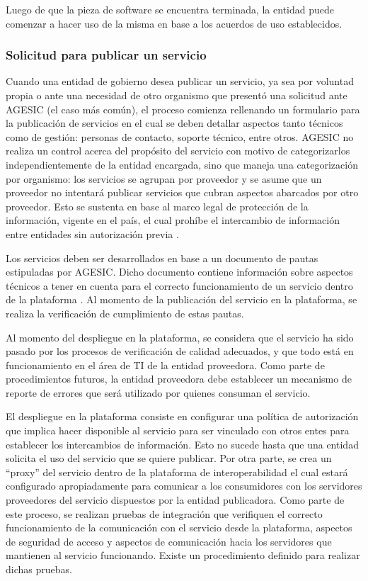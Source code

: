 Luego de que la pieza de software se encuentra terminada, la entidad puede comenzar a hacer uso de la misma en base a los acuerdos de uso establecidos.

\subsubsection{Solicitud para publicar un servicio}	
\label{Analisis:SolicitudPublicarServicio}
Cuando una entidad de gobierno desea publicar un servicio, ya sea por voluntad propia o ante una necesidad de otro organismo que presentó una solicitud ante AGESIC (el caso más común), el proceso comienza rellenando un formulario para la publicación de servicios en el cual se deben detallar aspectos tanto técnicos como de gestión: personas de contacto, soporte técnico, entre otros. \cite{Agesic:FormularioSolicitudV2.7}
AGESIC no realiza un control acerca del propósito del servicio con motivo de 
categorizarlos independientemente de la entidad encargada, sino que maneja una categorización por organismo: los servicios se agrupan por proveedor y se asume que un proveedor no intentará publicar servicios que cubran aspectos abarcados por otro proveedor. Esto se sustenta en base al marco legal de protección de la información, vigente en el país, el cual prohíbe el intercambio de información entre entidades sin autorización previa \cite{Ley} .

Los servicios deben ser desarrollados en base a un documento de pautas estipuladas por AGESIC. Dicho documento contiene información sobre aspectos técnicos a tener en cuenta para el correcto funcionamiento de un servicio dentro de la plataforma \cite{Agesic:RequerimientosPublicacionServicios}. Al momento de la publicación del servicio en la plataforma, se realiza la verificación de cumplimiento de estas pautas. 

Al momento del despliegue en la plataforma, se considera que el servicio ha sido pasado por los procesos de verificación de calidad adecuados, y que todo está en funcionamiento en el área de TI de la entidad proveedora. Como parte de procedimientos futuros, la entidad proveedora debe establecer un mecanismo de reporte de errores que será utilizado por quienes consuman el servicio. 

El despliegue en la plataforma consiste en configurar una política de autorización que implica hacer disponible al servicio para ser vinculado con otros entes para establecer los intercambios de información. Esto no sucede hasta que una entidad solicita el uso del servicio que se quiere publicar. Por otra parte, se crea un “proxy” del servicio dentro de la plataforma de interoperabilidad el cual estará configurado apropiadamente para comunicar a los consumidores con los servidores proveedores del servicio dispuestos por la entidad publicadora. Como parte de este proceso, se realizan pruebas de integración que verifiquen el correcto funcionamiento de la comunicación con el servicio desde la plataforma, aspectos de seguridad de acceso y aspectos de comunicación hacia los servidores que mantienen al servicio funcionando. Existe un procedimiento definido para realizar dichas pruebas.  

